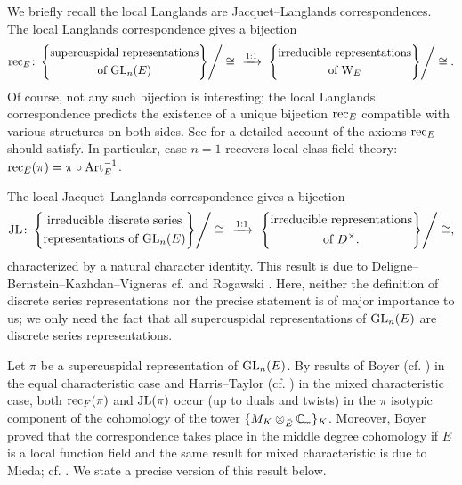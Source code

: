 \documentclass[../main.tex]{subfiles}
\begin{document}
We briefly recall the local Langlands are Jacquet--Langlands correspondences.
The local Langlands correspondence gives a bijection
\begin{equation*}
  \rec_E\colon \left\{
\begin{gathered}\text{supercuspidal representations} \\
\text{of $\GL_n(E)$}\end{gathered}\middle\}\right / \cong \ \ 
\xto{1:1} \  \left\{\begin{gathered}\text{irreducible representations} \\
\text{of $\Weil_E$} \end{gathered}\middle\}\right/\cong.
\end{equation*}
Of course, not any such bijection is interesting; the local Langlands correspondence
predicts the existence of a unique bijection $\mathrm{rec}_E$ compatible with various
structures on both sides. See \cite[Section 12.4]{getz2023introduction} for a
detailed account of the axioms $\mathrm{rec}_E$ should satisfy.
In particular, case $n=1$ recovers local class field theory: 
$\mathrm{rec}_E(\pi) = \pi \circ \operatorname{Art}_E^{-1}$. 

The local Jacquet--Langlands correspondence gives a bijection 
\begin{equation*}
  \JL\colon \left\{
\begin{gathered}\text{irreducible discrete series} \\
\text{representations of $\GL_n(E)$}\end{gathered}\middle\}\right / \cong \ \ 
\xto{1:1} \  \left\{\begin{gathered}\text{irreducible representations} \\
\text{of $D^\times$}. \end{gathered}\middle\}\right/\cong,
\end{equation*}
characterized by a natural character identity. This result is due to
Deligne--Bernstein--Kazhdan--Vigneras cf. \cite{deligne1984representations} and
Rogawski \cite{rogawski1983representations}. Here, neither the definition of discrete
series representations nor the precise statement is of major importance to us;
we only need the fact that all supercuspidal representations of $\operatorname{GL}_n(E)$ are
discrete series representations. 

Let $\pi$ be a supercuspidal representation of $\operatorname{GL}_n(E)$. 
By results of Boyer (cf. \cite{boyer1999mauvaise})
in the equal characteristic case and Harris--Taylor (cf. \cite{HTShimura}) in the 
mixed characteristic case, both $\mathrm{rec}_F(\pi)$ and $\mathrm{JL}(\pi)$ occur
(up to duals and twists) in the $\pi$ isotypic component of the cohomology of 
the tower $\{M_{K} \otimes_{\br E} \Cp\}_K$. 
Moreover, Boyer proved that the correspondence takes place in the middle degree
cohomology if $E$ is a local function field and the same result for 
mixed characteristic is due to Mieda; cf. \cite{mieda2010NonCusp}.
We state a precise version of this result below.
\end{document}
